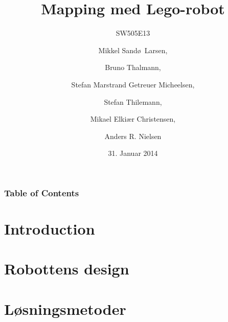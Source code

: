 \documentclass{beamer}
\title[Mapping med Lego-robot]{Mapping med Lego-robot}
\subtitle{SW505E13}
\author[SW505E13]{Mikkel Sand\o ~Larsen, \and Bruno Thalmann, \and Stefan Marstrand Getreuer Micheelsen, \and Stefan Thilemann, \and Mikael Elki\ae r Christensen, \and Anders R. Nielsen}
\institute[Aalborg University]
{
  Department of Computer Science\\
  Aalborg University}
\date[CFP 2003]{31. Januar 2014}
\begin{document}

\begin{frame}
  \titlepage
\end{frame}

\begin{frame}
    \frametitle{Table of Contents}
    \tableofcontents[sectionstyle=show/show,subsectionstyle=hide/hide/hide]
\end{frame}

\section{Introduction}




\section{Robottens design}


\section{Løsningsmetoder}

\end{document}
